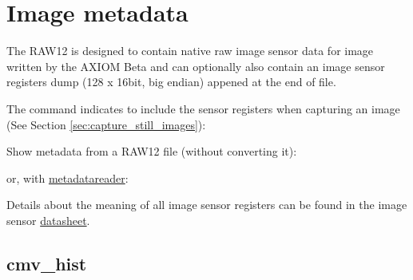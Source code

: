 \section{Image metadata}
The RAW12 is designed to contain native raw image sensor data for image written by the AXIOM Beta and can optionally also contain an image sensor registers dump (128 x 16bit, big endian) appened at the end of file.  

The  command indicates to include the sensor registers when capturing an image (See Section \ref{sec:capture_still_images}):

Show metadata from a RAW12 file (without converting it):


or, with \href{https://github.com/apertus-open-source-cinema/misc-tools-utilities/tree/master/cmv12000-metadata-reader}{metadatareader}:


Details about the meaning of all image sensor registers can be found in the image sensor  \href{https://github.com/apertus-open-source-cinema/beta-hardware/tree/master/Datasheets}{datasheet}. 

\subsection{cmv\_hist}
